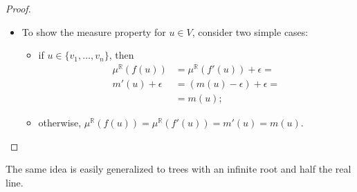 \documentclass{article}
\newcommand{\R}{\mathbb{R}}
\begin{document}
\begin{proof}
\begin{itemize}
\begin{itemize}
    \item To show the measure property for $u \in V$, consider two simple cases:
      \begin{itemize}
      \item if $u \in \{v_1, \dots, v_n\}$, then
        \begin{align*}
          \mu^\R(f(u)) &= \mu^\R(f'(u)) + \epsilon = \\
          m'(u) + \epsilon &= (m(u) - \epsilon) + \epsilon = \\
          &= m(u);
        \end{align*}
      \item otherwise, $\mu^\R(f(u)) = \mu^\R(f'(u)) = m'(u) = m(u)$.
      \end{itemize}
    \end{itemize}
  \end{itemize}
\end{proof}

The same idea is easily generalized to trees with an infinite root and half the real line.
\end{document}
